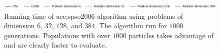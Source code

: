 \begin{figure}[ht!]
\begin{minipage}[t]{0.32\textwidth}
    \end{minipage}

    \begin{minipage}{\textwidth}
        \centering
        \includegraphics[width=\textwidth]{img/runs/time_pso2006_alldim_legend.pdf}
    \end{minipage}

    \caption[Running time of PSO2006]{Running time of \acrlong{acc:spso2006} algorithm using problems of dimension $6$, $32$, $128$, and $384$. The algorithm run for $1000$ generations. Populations with over $1000$ particles takes advantage of \gpu and are clearly faster to evaluate.}
    \label{meas:spso2006time}
\end{figure}

